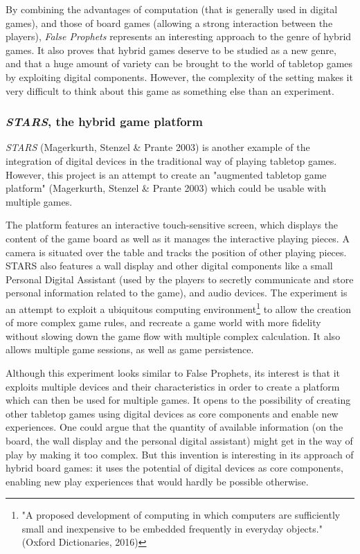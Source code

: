 By combining the advantages of computation (that is generally used in digital games), and those of board games (allowing a strong interaction between the players), \textit{False Prophets} represents an interesting approach to the genre of hybrid games. It also proves that hybrid games deserve to be studied as a new genre, and that a huge amount of variety can be brought to the world of tabletop games by exploiting digital components. However, the complexity of the setting makes it very difficult to think about this game as something else than an experiment. 
\subsubsection{\textit{STARS}, the hybrid game platform}
\textit{STARS} (Magerkurth, Stenzel \& Prante 2003)\cite{art:stars} is another example of the integration of digital devices in the traditional way of playing tabletop games. However, this project is an attempt to create an "augmented tabletop game platform" (Magerkurth, Stenzel \& Prante 2003) which could be usable with multiple games.

The platform features an interactive touch-sensitive screen, which displays the content of the game board as well as it manages the interactive playing pieces. A camera is situated over the table and tracks the position of other playing pieces. STARS also features a wall display and other digital components like a small Personal Digital Assistant (used by the players to secretly communicate and store personal information related to the game), and audio devices. The experiment is an attempt to exploit a ubiquitous computing environment\footnote{"A proposed development of computing in which computers are sufficiently small and inexpensive to be embedded frequently in everyday objects."(Oxford Dictionaries, 2016)} to allow the creation of more complex game rules, and recreate a game world with more fidelity without slowing down the game flow with multiple complex calculation. It also allows multiple game sessions, as well as game persistence. 

Although this experiment looks similar to False Prophets, its interest is that it exploits multiple devices and their characteristics in order to create a platform which can then be used for multiple games. It opens to the possibility of creating other tabletop games using digital devices as core components and enable new experiences. One could argue that the quantity of available information (on the board, the wall display and the personal digital assistant) might get in the way of play by making it too complex. But this invention is interesting in its approach of hybrid board games: it uses the potential of digital devices as core components, enabling new play experiences that would hardly be possible otherwise.

